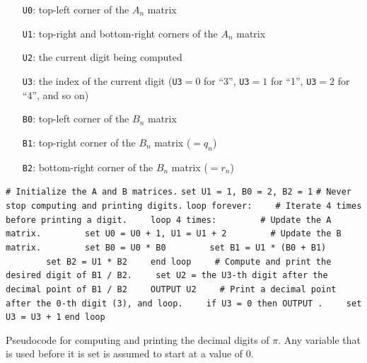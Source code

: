 \begin{itemize}
	\item[\texttt{U0}:] top-left corner of the $A_n$ matrix
	
	\item[\texttt{U1}:] top-right and bottom-right corners of the $A_n$ matrix
	
	\item[\texttt{U2}:] the current digit being computed
	
	\item[\texttt{U3}:] the index of the current digit (\texttt{U3}${} = 0$ for ``3'', \texttt{U3}${} = 1$ for ``1'', \texttt{U3}${} = 2$ for ``4'', and so on)\smallskip
	
	\item[\texttt{B0}:] top-left corner of the $B_n$ matrix
	
	\item[\texttt{B1}:] top-right corner of the $B_n$ matrix ($= q_n$)
	
	\item[\texttt{B2}:] bottom-right corner of the $B_n$ matrix ($= r_n$)\smallskip
\end{itemize}

\begin{pseudocode}
	\begin{algorithmic}[1]\small
		\State\texttt{\# Initialize the A and B matrices.}
		\State\texttt{set U1 = 1, B0 = 2, B2 = 1}
		\Statex
		\State\texttt{\# Never stop computing and printing digits.}
		\State\texttt{loop forever:}
		\State\texttt{~~~~\# Iterate 4 times before printing a digit.}
		\State\texttt{~~~~loop 4 times:}
		\State\texttt{~~~~~~~~\# Update the A matrix.}
		\State\texttt{~~~~~~~~set U0 = U0 + 1,  U1 = U1 + 2}
		\Statex
		\State\texttt{~~~~~~~~\# Update the B matrix.}
		\State\texttt{~~~~~~~~set B0 = U0 * B0}
		\State\texttt{~~~~~~~~set B1 = U1 * (B0 + B1)}
		\State\texttt{~~~~~~~~set B2 = U1 * B2}
		\State\texttt{~~~~end loop}
		\Statex
		\State\texttt{~~~~\# Compute and print the desired digit of B1 / B2.}
		\State\texttt{~~~~set U2 = the U3-th digit after the decimal point of B1 / B2}
		\State\texttt{~~~~OUTPUT U2}
		\Statex
		\State\texttt{~~~~\# Print a decimal point after the 0-th digit (3), and loop.}
		\State\texttt{~~~~if U3 = 0 then OUTPUT .}
		\State\texttt{~~~~set U3 = U3 + 1}
		\State\texttt{end loop}
	\end{algorithmic}
	\caption{Pseudocode for computing and printing the decimal digits of $\pi$. Any variable that is used before it is set is assumed to start at a value of $0$.}\label{alg:pseudocode_pi_calc}
\end{pseudocode}

